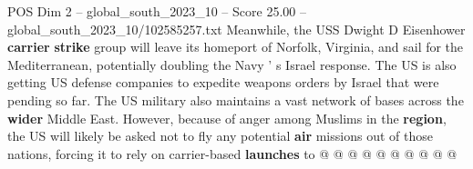 \begin{textsample}{POS Dim 2 – global\_south\_2023\_10 – Score 25.00 – global\_south\_2023\_10/102585257.txt}
Meanwhile, the USS Dwight D Eisenhower \textbf{carrier} \textbf{strike} group will leave its homeport of Norfolk, Virginia, and sail for the Mediterranean, potentially doubling the Navy ' s Israel response.
The US is also getting US defense companies to expedite weapons orders by Israel that were pending so far.
The US military also maintains a vast network of bases across the \textbf{wider} Middle East.
However, because of anger among Muslims in the \textbf{region}, the US will likely be asked not to fly any potential \textbf{air} missions out of those nations, forcing it to rely on carrier-based \textbf{launches} to @ @ @ @ @ @ @ @ @ @

\end{textsample}
